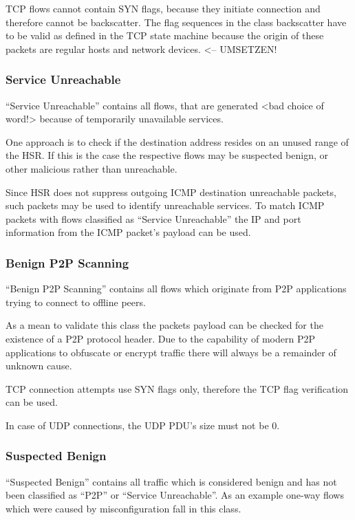 \documentclass[a4paper]{scrartcl}
\begin{document}
TCP flows cannot contain SYN flags, because they initiate connection and therefore cannot be backscatter. The flag sequences in the class backscatter have to be valid as defined in the TCP state machine \cite{rfc_tcp} because the origin of these packets are regular hosts and network devices. <-- UMSETZEN!

\subsubsection{Service Unreachable}
``Service Unreachable'' contains all flows, that are generated <bad choice of word!> because of temporarily unavailable services.

One approach is to check if the destination address resides on an unused range of the HSR. If this is the case the respective flows may be suspected benign, or other malicious rather than unreachable.

Since HSR does not suppress outgoing ICMP destination unreachable packets, such packets may be used to identify unreachable services. To match ICMP packets with flows classified as ``Service Unreachable'' the IP and port information from the ICMP packet's payload \cite{rfc_icmp} can be used. 

\subsubsection{Benign P2P Scanning}
``Benign P2P Scanning'' contains all flows which originate from P2P applications trying to connect to offline peers. 

As a mean to validate this class the packets payload can be checked for the existence of a P2P protocol header. Due to the capability of modern P2P applications to obfuscate \cite{emule} or encrypt \cite{vuze} traffic there will always be a remainder of unknown cause.

TCP connection attempts use SYN flags only, therefore the TCP flag verification can be used.

In case of UDP connections, the UDP PDU's size must not be 0.

\subsubsection{Suspected Benign}
``Suspected Benign'' contains all traffic which is considered benign and has not been classified as ``P2P'' or ``Service Unreachable''. As an example one-way flows which were caused by misconfiguration fall in this class.
\end{document}

